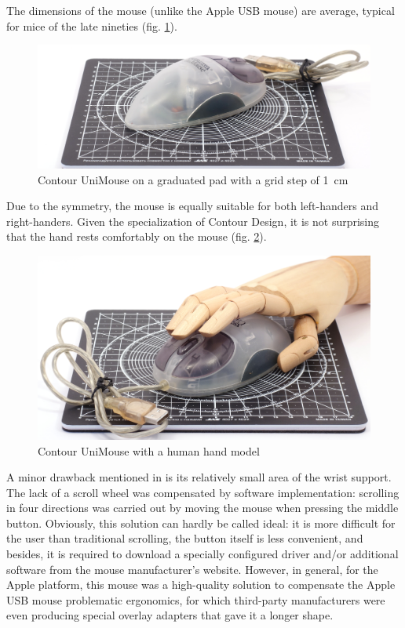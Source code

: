 \documentclass[11pt, a4paper]{article}
\begin{document}
The dimensions of the mouse (unlike the Apple USB mouse) are average, typical for mice of the late nineties (fig. \ref{fig:ContourUniMouseSize}).

\begin{figure}[h]
    \centering
    \includegraphics[scale=0.5]{1999_contour_unimouse/size_30.jpg}
    \caption{Contour UniMouse on a graduated pad with a grid step of 1~cm}
    \label{fig:ContourUniMouseSize}
\end{figure}

Due to the symmetry, the mouse is equally suitable for both left-handers and right-handers. Given the specialization of Contour Design, it is not surprising that the hand rests comfortably on the mouse (fig. \ref{fig:ContourUniMouseHand}).

\begin{figure}[h]
    \centering
    \includegraphics[scale=0.55]{1999_contour_unimouse/hand_30.jpg}
    \caption{Contour UniMouse with a human hand model}
    \label{fig:ContourUniMouseHand}
\end{figure}

A minor drawback mentioned in \cite{mactoday} is its relatively small area of the wrist support. The lack of a scroll wheel was compensated by software implementation: scrolling in four directions was carried out by moving the mouse when pressing the middle button. Obviously, this solution can hardly be called ideal: it is more difficult for the user than traditional scrolling, the button itself is less convenient, and besides, it is required to download a specially configured driver and/or additional software from the mouse manufacturer's website. However, in general, for the Apple platform, this mouse was a high-quality solution to compensate the Apple USB mouse problematic ergonomics, for which third-party manufacturers were even producing special overlay adapters that gave it a longer shape.
\end{document}
